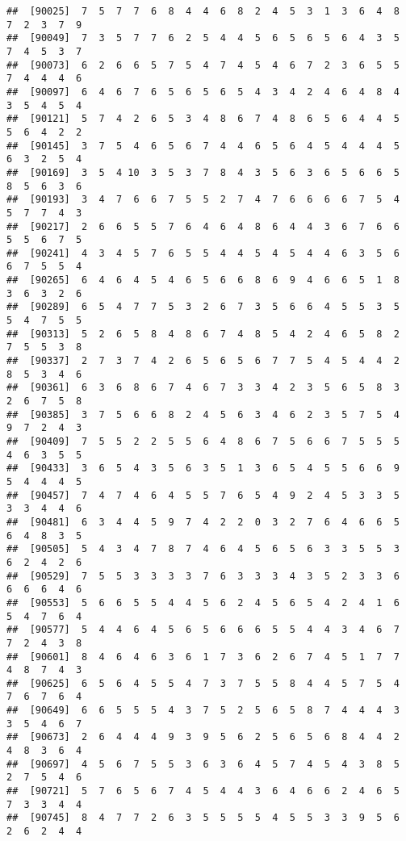 \documentclass[
]{book}
\begin{document}
\begin{verbatim}
##  [90025]  7  5  7  7  6  8  4  4  6  8  2  4  5  3  1  3  6  4  8  7  2  3  7  9
##  [90049]  7  3  5  7  7  6  2  5  4  4  5  6  5  6  5  6  4  3  5  7  4  5  3  7
##  [90073]  6  2  6  6  5  7  5  4  7  4  5  4  6  7  2  3  6  5  5  7  4  4  4  6
##  [90097]  6  4  6  7  6  5  6  5  6  5  4  3  4  2  4  6  4  8  4  3  5  4  5  4
##  [90121]  5  7  4  2  6  5  3  4  8  6  7  4  8  6  5  6  4  4  5  5  6  4  2  2
##  [90145]  3  7  5  4  6  5  6  7  4  4  6  5  6  4  5  4  4  4  5  6  3  2  5  4
##  [90169]  3  5  4 10  3  5  3  7  8  4  3  5  6  3  6  5  6  6  5  8  5  6  3  6
##  [90193]  3  4  7  6  6  7  5  5  2  7  4  7  6  6  6  6  7  5  4  5  7  7  4  3
##  [90217]  2  6  6  5  5  7  6  4  6  4  8  6  4  4  3  6  7  6  6  5  5  6  7  5
##  [90241]  4  3  4  5  7  6  5  5  4  4  5  4  5  4  4  6  3  5  6  6  7  5  5  4
##  [90265]  6  4  6  4  5  4  6  5  6  6  8  6  9  4  6  6  5  1  8  3  6  3  2  6
##  [90289]  6  5  4  7  7  5  3  2  6  7  3  5  6  6  4  5  5  3  5  5  4  7  5  5
##  [90313]  5  2  6  5  8  4  8  6  7  4  8  5  4  2  4  6  5  8  2  7  5  5  3  8
##  [90337]  2  7  3  7  4  2  6  5  6  5  6  7  7  5  4  5  4  4  2  8  5  3  4  6
##  [90361]  6  3  6  8  6  7  4  6  7  3  3  4  2  3  5  6  5  8  3  2  6  7  5  8
##  [90385]  3  7  5  6  6  8  2  4  5  6  3  4  6  2  3  5  7  5  4  9  7  2  4  3
##  [90409]  7  5  5  2  2  5  5  6  4  8  6  7  5  6  6  7  5  5  5  4  6  3  5  5
##  [90433]  3  6  5  4  3  5  6  3  5  1  3  6  5  4  5  5  6  6  9  5  4  4  4  5
##  [90457]  7  4  7  4  6  4  5  5  7  6  5  4  9  2  4  5  3  3  5  3  3  4  4  6
##  [90481]  6  3  4  4  5  9  7  4  2  2  0  3  2  7  6  4  6  6  5  6  4  8  3  5
##  [90505]  5  4  3  4  7  8  7  4  6  4  5  6  5  6  3  3  5  5  3  6  2  4  2  6
##  [90529]  7  5  5  3  3  3  3  7  6  3  3  3  4  3  5  2  3  3  6  6  6  6  4  6
##  [90553]  5  6  6  5  5  4  4  5  6  2  4  5  6  5  4  2  4  1  6  5  4  7  6  4
##  [90577]  5  4  4  6  4  5  6  5  6  6  6  5  5  4  4  3  4  6  7  7  2  4  3  8
##  [90601]  8  4  6  4  6  3  6  1  7  3  6  2  6  7  4  5  1  7  7  4  8  7  4  3
##  [90625]  6  5  6  4  5  5  4  7  3  7  5  5  8  4  4  5  7  5  4  7  6  7  6  4
##  [90649]  6  6  5  5  5  4  3  7  5  2  5  6  5  8  7  4  4  4  3  3  5  4  6  7
##  [90673]  2  6  4  4  4  9  3  9  5  6  2  5  6  5  6  8  4  4  2  4  8  3  6  4
##  [90697]  4  5  6  7  5  5  3  6  3  6  4  5  7  4  5  4  3  8  5  2  7  5  4  6
##  [90721]  5  7  6  5  6  7  4  5  4  4  3  6  4  6  6  2  4  6  5  7  3  3  4  4
##  [90745]  8  4  7  7  2  6  3  5  5  5  5  4  5  5  3  3  9  5  6  2  6  2  4  4

\end{verbatim}
\end{document}
